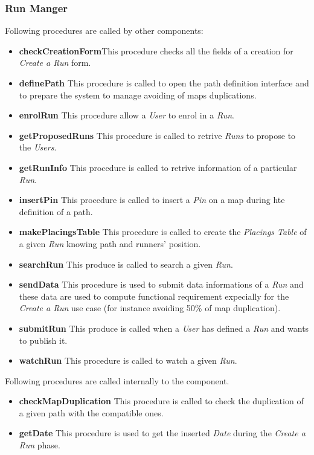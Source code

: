 \subsubsection{Run Manger}
Following procedures are called by other components:
\begin{itemize}
  \item \textbf{checkCreationForm}\quad This procedure checks all the fields of a creation for \textit{Create a Run} form.
  \item \textbf{definePath} \quad This procedure is called to open the path definition interface and to prepare the system to manage avoiding of maps duplications.
  \item \textbf{enrolRun} \quad This procedure allow a \textit{User} to enrol in a \textit{Run}.
  \item \textbf{getProposedRuns} \quad This procedure is called to retrive \textit{Runs} to propose to the \textit{Users}.
  \item \textbf{getRunInfo} \quad This procedure is called to retrive information of a particular \textit{Run}.
  \item \textbf{insertPin} \quad This procedure is called to insert a \textit{Pin} on a map during hte definition of a path.
  \item \textbf{makePlacingsTable} \quad This procedure is called to create the \textit{Placings Table} of a given \textit{Run} knowing path and runners' position.
  \item \textbf{searchRun} \quad This produce is called to search a given \textit{Run}.
  \item \textbf{sendData} \quad This procedure is used to submit data informations of a \textit{Run} and these data are used to compute functional requirement expecially for the \textit{Create a Run} use case (for instance avoiding 50\% of map duplication).
  \item \textbf{submitRun} \quad This produce is called when a \textit{User} has defined a \textit{Run} and wants to publish it.
  \item \textbf{watchRun} \quad This procedure is called to watch a given \textit{Run}.
\end{itemize}

\myparagraph{}
Following procedures are called internally to the component.
\begin{itemize}
  \item \textbf{checkMapDuplication} \quad This procedure is called to check the duplication of a given path with the compatible ones.
  \item \textbf{getDate} \quad This procedure is used to get the inserted \textit{Date} during the \textit{Create a Run} phase.
\end{itemize}

